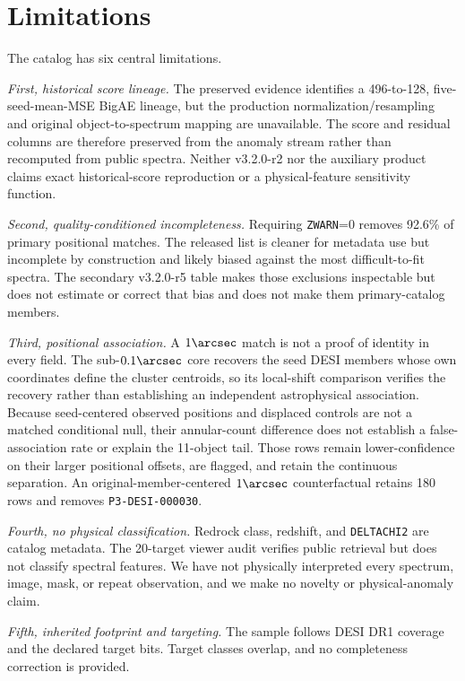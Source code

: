 \documentclass[twocolumn,linenumbers]{aastex702}
\newcommand{\releaseVersion}{v3.2.0-r2}
\newcommand{\warnedAuxVersion}{v3.2.0-r5}
\begin{document}
\section{Limitations}\label{sec:limitations}

The catalog has six central limitations.

\textit{First, historical score lineage.}  The preserved evidence identifies a 496-to-128,
five-seed-mean-MSE BigAE lineage, but the production normalization/resampling and original
object-to-spectrum mapping are unavailable.  The score and residual columns are therefore
preserved from the anomaly stream rather than recomputed from public spectra.  Neither
\releaseVersion{} nor the auxiliary product claims exact historical-score reproduction or a
physical-feature sensitivity function.

\textit{Second, quality-conditioned incompleteness.}  Requiring \texttt{ZWARN}=0 removes 92.6\%
of primary positional matches.  The released list is cleaner for metadata use but incomplete by
construction and likely biased against the most difficult-to-fit spectra.  The secondary
\warnedAuxVersion{} table makes those exclusions inspectable but does not estimate or correct that
bias and does not make them primary-catalog members.

\textit{Third, positional association.}  A $1\arcsec$ match is not a proof of identity in every
field.  The sub-$0.1\arcsec$ core recovers the seed DESI members whose own coordinates define the
cluster centroids, so its local-shift comparison verifies the recovery rather than establishing an
independent astrophysical association.  Because seed-centered observed positions and displaced
controls are not a matched conditional null, their annular-count difference does not establish a
false-association rate or explain the 11-object tail.  Those rows remain lower-confidence on their
larger positional offsets, are flagged, and retain the continuous separation.  An
original-member-centered $1\arcsec$ counterfactual retains 180 rows and removes
\texttt{P3-DESI-000030}.

\textit{Fourth, no physical classification.}  Redrock class, redshift, and \texttt{DELTACHI2} are
catalog metadata.  The 20-target viewer audit verifies public retrieval but does not classify
spectral features.  We have not physically interpreted every spectrum, image, mask, or repeat
observation, and we make no novelty or physical-anomaly claim.

\textit{Fifth, inherited footprint and targeting.}  The sample follows DESI DR1 coverage and the
declared target bits.  Target classes overlap, and no completeness correction is provided.
\end{document}
